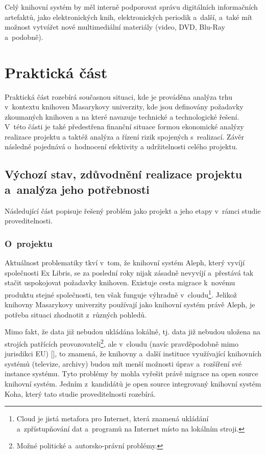 \documentclass[
	11pt, oneside, printed, final, palatino, monochrome
	microtype,
	table,   %
	lof,     %
	lot     %
]{fithesis3}
\newcommand{\citepages}[2]{[\cite[#1]{#2}]}
\begin{document}
{Celý knihovní systém by měl interně podporovat správu digitálních informačních artefaktů, jako  elektronických knih, elektronických periodik a~další, a~také mít možnost vytvářet nové multimediální materiály (video, DVD, Blu-Ray a~podobně).

\chapter{Praktická část}

Praktická část rozebírá současnou situaci, kde je prováděna analýza trhu v~kontextu knihoven Masarykovy univerzity, kde jsou definovány požadavky zkoumaných knihoven a na které navazuje technické a technologické řešení. V~této části je také předestřena finanční situace formou ekonomické analýzy realizace projektu a taktéž analýza a řízení rizik spojených s~realizací. Závěr následně pojednává o~hodnocení efektivity a udržitelnosti celého projektu.

\section{Výchozí stav, zdůvodnění realizace projektu a~analýza jeho potřebnosti}

Následující část popisuje řešený problém jako projekt a jeho etapy v~rámci studie proveditelnosti.

\subsection{O~projektu}

Aktuálnost problematiky tkví v~tom, že knihovní systém Aleph, který vyvíjí společnosti Ex Libris, se za poslední roky nijak zásadně nevyvíjí a~přestává tak stačit uspokojovat požadavky knihoven. Existuje cesta migrace k~novému produktu stejné společnosti, ten však funguje výhradně v~cloudu\footnote{Cloud je jistá metafora pro Internet, která znamená ukládání a~zpřístupňování dat a~programů na Internet místo na lokálním stroji.}. Jelikož knihovny Masarykovy univerzity používají jako knihovní systém právě Aleph, je potřeba situaci zhodnotit z~různých pohledů.

Mimo fakt, že data již nebudou ukládána lokálně, tj. data již nebudou uložena na strojích patřících provozovateli\footnote{Možné politické a~autorsko-právní problémy.}, ale v~cloudu (navíc pravděpodobně mimo jurisdikci EU) \citepages{16-17}{breeding_2012}, to znamená, že knihovny a~další instituce využívající knihovních systémů (televize, archivy) budou mít menší možnosti úprav a~rozšíření své instance systému. Tyto problémy by mohla vyřešit právě migrace na open source knihovní systém. Jedním z~kandidátů je open source integrovaný knihovní systém Koha, který tato studie proveditelnosti rozebírá. 

}
\end{document}
